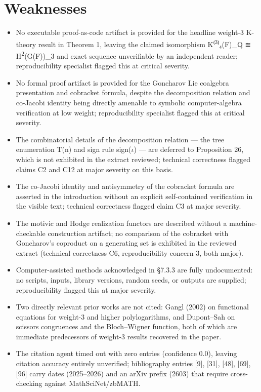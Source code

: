 \documentclass[11pt]{article}
\begin{document}
\section*{Weaknesses}
\begin{itemize}[leftmargin=*]
  \item No executable proof-as-code artifact is provided for the headline weight-3 K-theory result in Theorem 1, leaving the claimed isomorphism K⁽\textsuperscript{3}⁾₄(F)\_Q ≅ H\textsuperscript{2}(G(F))\_3 and exact sequence unverifiable by an independent reader; reproducibility specialist flagged this at critical severity.
  \item No formal proof artifact is provided for the Goncharov Lie coalgebra presentation and cobracket formula, despite the decomposition relation and co-Jacobi identity being directly amenable to symbolic computer-algebra verification at low weight; reproducibility specialist flagged this at critical severity.
  \item The combinatorial details of the decomposition relation --- the tree enumeration T(n) and sign rule sign(\ensuremath{\iota}) --- are deferred to Proposition 26, which is not exhibited in the extract reviewed; technical correctness flagged claims C2 and C12 at major severity on this basis.
  \item The co-Jacobi identity and antisymmetry of the cobracket formula are asserted in the introduction without an explicit self-contained verification in the visible text; technical correctness flagged claim C3 at major severity.
  \item The motivic and Hodge realization functors are described without a machine-checkable construction artifact; no comparison of the cobracket with Goncharov's coproduct on a generating set is exhibited in the reviewed extract (technical correctness C6, reproducibility concern 3, both major).
  \item Computer-assisted methods acknowledged in §7.3.3 are fully undocumented: no scripts, inputs, library versions, random seeds, or outputs are supplied; reproducibility flagged this at major severity.
  \item Two directly relevant prior works are not cited: Gangl (2002) on functional equations for weight-3 and higher polylogarithms, and Dupont--Sah on scissors congruences and the Bloch--Wigner function, both of which are immediate predecessors of weight-3 results recovered in the paper.
  \item The citation agent timed out with zero entries (confidence 0.0), leaving citation accuracy entirely unverified; bibliography entries [9], [31], [48], [69], [96] carry dates (2025--2026) and an arXiv prefix (2603) that require cross-checking against MathSciNet/zbMATH.
\end{itemize}
\end{document}
